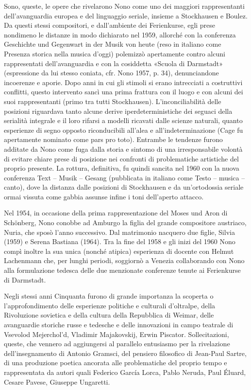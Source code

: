 Sono, queste, le opere che rivelarono Nono come uno dei maggiori rappresentanti dell’avanguardia europea e del linguaggio seriale, insieme a Stockhausen e Boulez. Da questi stessi compositori, e dall’ambiente dei Ferienkurse, egli prese nondimeno le distanze in modo dichiarato nel 1959, allorché con la conferenza Geschichte und Gegenwart in der Musik von heute (reso in italiano come Presenza storica nella musica d’oggi) polemizzò apertamente contro alcuni rappresentati dell’avanguardia e con la cosiddetta «Scuola di Darmstadt» (espressione da lui stesso coniata, cfr. Nono 1957, p. 34), denunciandone incoerenze e aporie. Dopo anni in cui gli stimoli si erano intrecciati a costruttivi conflitti, questo intervento sancì una prima frattura con il luogo e con alcuni dei suoi rappresentanti (primo tra tutti Stockhausen). L’inconciliabilità delle posizioni riguardava tanto alcune derive iperdeterministiche dei seguaci della serialità integrale e il loro rifarsi a modelli ricavati dalle scienze naturali, quanto esperienze di segno opposto riconducibili all’alea e all’indeterminazione (Cage fu apertamente nominato come pars pro toto). Entrambe le tendenze furono additate da Nono come fuga dalla storia e sintomo di una irresponsabile volontà di evitare chiare prese di posizione nei confronti di problematiche artistiche del proprio presente. La rottura, definitiva, fu quindi sancita nel 1960 con la nuova conferenza Text – Musik – Gesang (pubblicata in italiano come Testo – musica – canto), dove la distanza dalle posizioni di Stockhausen e da un’ortodossia seriale ormai vissuta come gabbia assunse infine i toni dell’aperto attacco.

Nel 1954, in occasione della prima rappresentazione del Moses und Aron di Schönberg, Nono conobbe ad Amburgo la figlia del grande compositore austriaco, Nuria, che sposò l’anno successivo. Dal matrimonio nacquero due figlie, Silvia (1959) e Serena Bastiana (1964). Tra la fine del 1958 e gli inizi del 1960 Nono compì inoltre la sua unica (nonché atipica) esperienza di docente con Helmut Lachenmann che, per lunghi periodi, soggiornò a Venezia collaborando con Nono alla formulazione tedesca delle due menzionate conferenze tenute ai Ferienkurse di Darmstadt.

Negli stessi anni Cinquanta furono di grande importanza la scoperta o l’approfondimento delle esperienze politiche e culturali d’oltralpe, della Rivoluzione sovietica e della cultura della Repubblica di Weimar, delle avanguardie storiche russe e tedesche e delle innovazioni in campo teatrale di Vsevolod Mejerchol’d, Vladimir Majakovskij, Erwin Piscator. Sollecitazioni, queste, che vennero ad aggiungersi al parallelo entusiasmo per la rivelazione dell’insegnamento di Antonio Gramsci, del pensiero filosofico di Jean-Paul Sartre, di una produzione poetica ancorata alle problematiche del proprio tempo e rappresentata da autori quali Federico García Lorca, Pablo Neruda, Paul Éluard, Cesare Pavese, Giuseppe Ungaretti.

